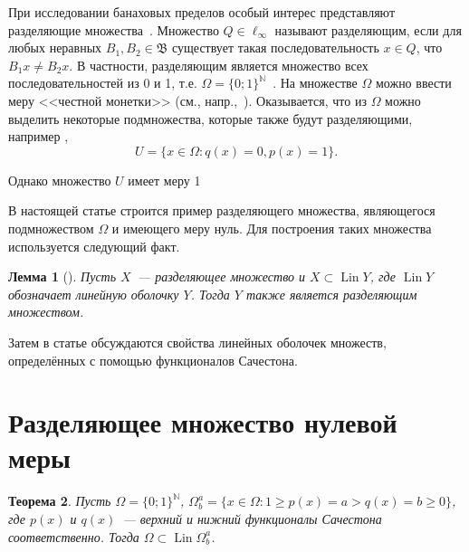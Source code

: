\documentclass[a4paper,14pt]{article} %
\theoremstyle{plain}
\newtheorem{lemma}{Лемма}[section]
\newtheorem{theorem}[lemma]{Теорема}
\begin{document}
При исследовании банаховых пределов особый интерес представляют разделяющие множества~\cite[\S 3]{Semenov2014geomprops}.
Множество $Q\in\ell_\infty$ называют разделяющим, если
для любых неравных $B_1, B_2\in\mathfrak{B}$ существует такая последовательность $x\in Q$,
что $B_1 x \neq B_2 x$.
В частности, разделяющим является множество всех последовательностей из 0 и 1, т.е.
$\Omega=\{0;1\}^\mathbb{N}$~\cite{semenov2010characteristic}.
На множестве $\Omega$ можно ввести меру <<честной монетки>> (см., напр.,~\cite{connor1990almost}).
Оказывается, что из $\Omega$ можно выделить некоторые подмножества, которые также будут разделяющими,
например \cite[\S 3, Теорема 11]{Semenov2014geomprops},
\begin{equation}
	U = \{ x\in\Omega: q(x) = 0, p(x) = 1 \}
	.
\end{equation}

Однако множество $U$ имеет меру 1~\cite{semenov2010characteristic}

В настоящей статье строится пример разделяющего множества,
являющегося подмножеством $\Omega$ и имеющего меру нуль.
Для построения таких множества используется следующий факт.

\begin{lemma}[{\cite[\S 3, замечание 6]{Semenov2014geomprops}}]
	Пусть $X$~--- разделяющее множество и $X \subset \operatorname{Lin} Y$,
	где $\operatorname{Lin} Y$ обозначает линейную оболочку $Y$.
	Тогда $Y$ также является разделяющим множеством.
\end{lemma}
Затем в статье обсуждаются свойства линейных оболочек множеств, определённых с помощью функционалов Сачестона.

\section{Разделяющее множество нулевой меры}

\begin{theorem}
	\label{thm:Lin_Omega_Sucheston}
	Пусть $\Omega = \{0;1\}^\mathbb{N}$,
	$\Omega^a_b = \{x\in\Omega : 1 \geq p(x) = a > q(x) = b \geq 0\}$,
	где $p(x)$ и $q(x)$~--- верхний и нижний функционалы Сачестона~\cite{sucheston1967banach} соответственно.
	Тогда $\Omega \subset \operatorname{Lin} \Omega^a_b$.
\end{theorem}
\end{document}
